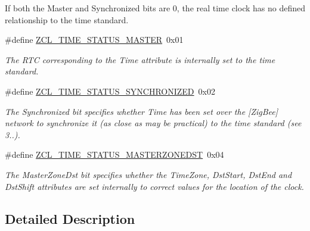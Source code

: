 \begin{DoxyItemize}
\item If both the Master and Synchronized bits are 0, the real time clock has no defined relationship to the time standard. 
\end{DoxyItemize}\begin{DoxyCompactItemize}
\item 
\#define \hyperlink{group__zcl__time_gabf057b123b136f20ade3faf065dcb298}{Z\-C\-L\-\_\-\-T\-I\-M\-E\-\_\-\-S\-T\-A\-T\-U\-S\-\_\-\-M\-A\-S\-T\-E\-R}~0x01
\begin{DoxyCompactList}\small\item\em The R\-T\-C corresponding to the Time attribute is internally set to the time standard. \end{DoxyCompactList}\item 
\#define \hyperlink{group__zcl__time_ga07fc4fc7df3e8b1b44817bcaa50b7170}{Z\-C\-L\-\_\-\-T\-I\-M\-E\-\_\-\-S\-T\-A\-T\-U\-S\-\_\-\-S\-Y\-N\-C\-H\-R\-O\-N\-I\-Z\-E\-D}~0x02
\begin{DoxyCompactList}\small\item\em The Synchronized bit specifies whether Time has been set over the \mbox{[}Zig\-Bee\mbox{]} network to synchronize it (as close as may be practical) to the time standard (see 3..). \end{DoxyCompactList}\item 
\#define \hyperlink{group__zcl__time_ga76367e10cd6d032aad80cdd4786c1eca}{Z\-C\-L\-\_\-\-T\-I\-M\-E\-\_\-\-S\-T\-A\-T\-U\-S\-\_\-\-M\-A\-S\-T\-E\-R\-Z\-O\-N\-E\-D\-S\-T}~0x04
\begin{DoxyCompactList}\small\item\em The Master\-Zone\-Dst bit specifies whether the Time\-Zone, Dst\-Start, Dst\-End and Dst\-Shift attributes are set internally to correct values for the location of the clock. \end{DoxyCompactList}\end{DoxyCompactItemize}


\subsection{Detailed Description}


